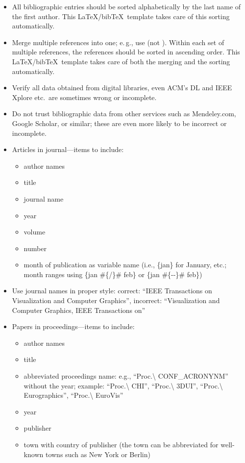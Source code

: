 \documentclass[journal]{vgtc}                %
\begin{document}
\begin{itemize}
  \item All bibliographic entries should be sorted alphabetically by the last name of the first author.
        This \LaTeX/bib\TeX\ template takes care of this sorting automatically.
  \item Merge multiple references into one; e.\,g., use \cite{Max:1995:OMF,Kitware:2003} (not \cite{Kitware:2003}\cite{Max:1995:OMF}).
        Within each set of multiple references, the references should be sorted in ascending order.
        This \LaTeX/bib\TeX\ template takes care of both the merging and the sorting automatically.
  \item Verify all data obtained from digital libraries, even ACM's DL and IEEE Xplore  etc.\ are sometimes wrong or incomplete.
  \item Do not trust bibliographic data from other services such as Mendeley.com, Google Scholar, or similar; these are even more likely to be incorrect or incomplete.
  \item Articles in journal---items to include:
        \begin{itemize}
  	      \item author names
  	      \item title
  	      \item journal name
  	      \item year
  	      \item volume
  	      \item number
  	      \item month of publication as variable name (i.e., \{jan\} for January, etc.; month ranges using \{jan \#\{/\}\# feb\} or \{jan \#\{-{}-\}\# feb\})
        \end{itemize}
  \item Use journal names in proper style: correct: ``IEEE Transactions on Visualization and Computer Graphics'', incorrect: ``Visualization and Computer Graphics, IEEE Transactions on''
  \item Papers in proceedings---items to include:
        \begin{itemize}
  	      \item author names
  	      \item title
  	      \item abbreviated proceedings name: e.g., ``Proc.\textbackslash{} CONF\_ACRONYNM'' without the year; example: ``Proc.\textbackslash{} CHI'', ``Proc.\textbackslash{} 3DUI'', ``Proc.\textbackslash{} Eurographics'', ``Proc.\textbackslash{} EuroVis''
  	      \item year
  	      \item publisher
  	      \item town with country of publisher (the town can be abbreviated for well-known towns such as New York or Berlin)
        \end{itemize}


\end{itemize}
\end{document}
